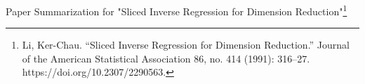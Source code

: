 \documentclass[UTF8,a4paper,10pt]{article}
\begin{document}





\pagebreak

  \begin{Problem}[]{}
  Paper Summarization for "Sliced Inverse Regression for Dimension Reduction"\footnote{Li, Ker-Chau. “Sliced Inverse Regression for Dimension Reduction.” Journal of the American Statistical Association 86, no. 414 (1991): 316–27. https://doi.org/10.2307/2290563.}
    
  \end{Problem}
\end{document}
